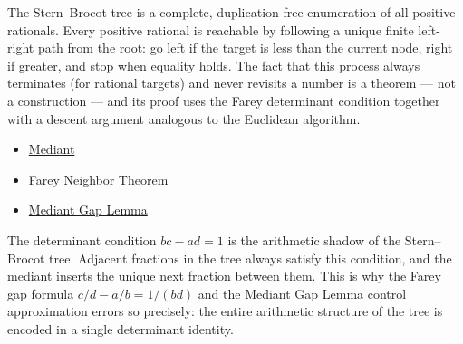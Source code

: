 \begin{remark*}[Interpretation]
The Stern--Brocot tree is a complete, duplication-free enumeration of all
positive rationals.  Every positive rational is reachable by following a
unique finite left-right path from the root: go left if the target is less
than the current node, right if greater, and stop when equality holds.
The fact that this process always terminates (for rational targets) and
never revisits a number is a theorem — not a construction — and its proof
uses the Farey determinant condition together with a descent argument
analogous to the Euclidean algorithm.
\end{remark*}

\begin{remark*}[Dependencies]
\begin{itemize}
  \item \hyperref[def:mediant]{Mediant}
  \item \hyperref[thm:farey-neighbor-theorem]{Farey Neighbor Theorem}
  \item \hyperref[lem:mediant-gap]{Mediant Gap Lemma}
\end{itemize}
\end{remark*}

\begin{remark*}
The determinant condition $bc - ad = 1$ is the arithmetic shadow of the
Stern--Brocot tree.  Adjacent fractions in the tree always satisfy this
condition, and the mediant inserts the unique next fraction between them.
This is why the Farey gap formula $c/d - a/b = 1/(bd)$ and the Mediant
Gap Lemma control approximation errors so precisely: the entire arithmetic
structure of the tree is encoded in a single determinant identity.
\end{remark*}
